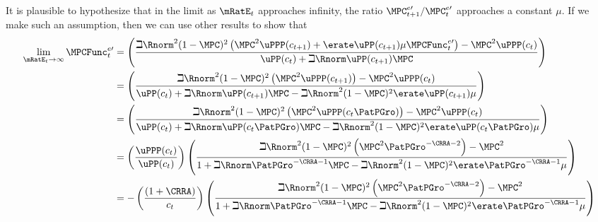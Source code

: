 \documentclass{\handout}
\begin{document}
\begin{CDCPrivate} %
It is plausible to hypothesize that in the limit as $\mRatE_{t}$ approaches infinity, the ratio $\MPC^{e \prime}_{t+1}/\MPC^{e \prime}_{t}$ approaches
a constant $\mu$.  If we make such an assumption, then we can use other results to show that
\begin{equation}\begin{gathered}\begin{aligned}
\lim_{\mRatE_{t} \rightarrow \infty} \MPCFunc^{e\prime}_{t}   & =  \left(\frac{\beth \Rnorm^{2} (1-\MPC)^{2} \left(\MPC^{2}\uPPP({c}_{t+1}) +\erate \uPP({c}_{t+1}) \mu \MPCFunc^{e \prime}_{t}\right)-\MPC^{2} \uPPP({c}_{t})}{\uPP({c}_{t})+\beth \Rnorm \uPP({c}_{t+1})\MPC  }\right) 
\\ & =  \left(\frac{\beth \Rnorm^{2} (1-\MPC)^{2} \left(\MPC^{2}\uPPP({c}_{t+1})\right)-\MPC^{2} \uPPP({c}_{t})}{\uPP({c}_{t})+\beth \Rnorm \uPP({c}_{t+1})\MPC  -\beth \Rnorm^{2} (1-\MPC)^{2} \erate \uPP({c}_{t+1}) \mu  }\right) 
\\ & =  \left(\frac{\beth \Rnorm^{2} (1-\MPC)^{2} \left(\MPC^{2}\uPPP({c}_{t}\PatPGro)\right)-\MPC^{2} \uPPP({c}_{t})}{\uPP({c}_{t})+\beth \Rnorm \uPP({c}_{t}\PatPGro)\MPC  -\beth \Rnorm^{2} (1-\MPC)^{2} \erate \uPP({c}_{t}\PatPGro) \mu  }\right) 
\\ & =  \left(\frac{\uPPP({c}_{t})}{\uPP({c}_{t})}\right)\left(\frac{\beth \Rnorm^{2} (1-\MPC)^{2} \left(\MPC^{2}\PatPGro^{-\CRRA-2}\right)-\MPC^{2} }{1+\beth \Rnorm \PatPGro^{-\CRRA-1}\MPC  -\beth \Rnorm^{2} (1-\MPC)^{2} \erate \PatPGro^{-\CRRA-1} \mu  }\right) 
\\ & =  -\left(\frac{(1+\CRRA)}{{c}_{t}}\right)\left(\frac{\beth \Rnorm^{2} (1-\MPC)^{2} \left(\MPC^{2}\PatPGro^{-\CRRA-2}\right)-\MPC^{2} }{1+\beth \Rnorm \PatPGro^{-\CRRA-1}\MPC  -\beth \Rnorm^{2} (1-\MPC)^{2} \erate \PatPGro^{-\CRRA-1} \mu  }\right) 
\end{aligned}\end{gathered}\end{equation}
\end{CDCPrivate}
\end{document}
